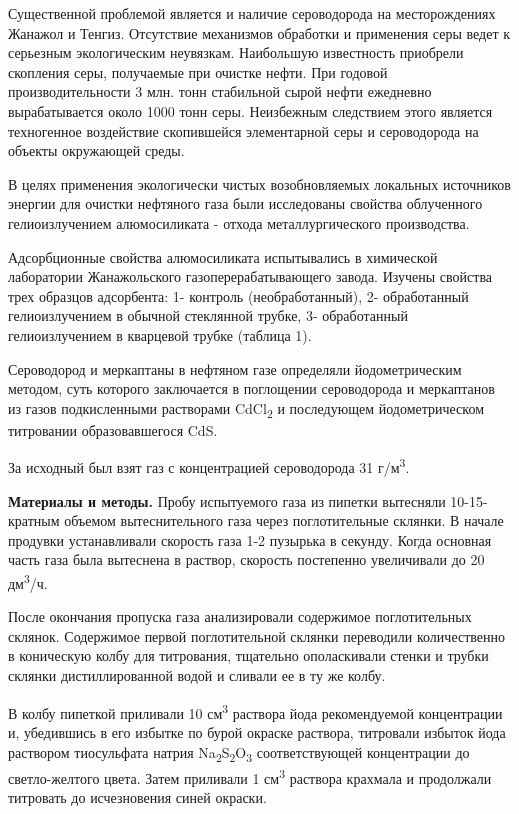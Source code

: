 \begin{multicols}{2}
Существенной проблемой является и наличие сероводорода на месторождениях
Жанажол и Тенгиз. Отсутствие механизмов обработки и применения серы
ведет к серьезным экологическим неувязкам. Наибольшую известность
приобрели скопления серы, получаемые при очистке нефти. При годовой
производительности 3 млн. тонн стабильной сырой нефти ежедневно
вырабатывается около 1000 тонн серы. Неизбежным следствием этого
является техногенное воздействие скопившейся элементарной серы и
сероводорода на объекты окружающей среды.

В целях применения экологически чистых возобновляемых локальных
источников энергии для очистки нефтяного газа были исследованы свойства
облученного гелиоизлучением алюмосиликата - отхода металлургического
производства.

Адсорбционные свойства алюмосиликата испытывались в химической
лаборатории Жанажольского газоперерабатывающего завода. Изучены свойства
трех образцов адсорбента: 1- контроль (необработанный), 2- обработанный
гелиоизлучением в обычной стеклянной трубке, 3- обработанный
гелиоизлучением в кварцевой трубке (таблица 1).

Сероводород и меркаптаны в нефтяном газе определяли йодометрическим
методом, суть которого заключается в поглощении сероводорода и
меркаптанов из газов подкисленными растворами CdCl\textsubscript{2} и
последующем йодометрическом титровании образовавшегося CdS.

За исходный был взят газ с концентрацией сероводорода 31
г/м\textsuperscript{3}.

{\bfseries Материалы и методы.} Пробу испытуемого газа из пипетки вытесняли
10-15-кратным объемом вытеснительного газа через поглотительные склянки.
В начале продувки устанавливали скорость газа 1-2 пузырька в секунду.
Когда основная часть газа была вытеснена в раствор, скорость постепенно
увеличивали до 20 дм\textsuperscript{3}/ч.

После окончания пропуска газа анализировали содержимое поглотительных
склянок. Содержимое первой поглотительной склянки переводили
количественно в коническую колбу для титрования, тщательно ополаскивали
стенки и трубки склянки дистиллированной водой и сливали ее в ту же
колбу.

В колбу пипеткой приливали 10 см\textsuperscript{3} раствора йода
рекомендуемой концентрации и, убедившись в его избытке по бурой окраске
раствора, титровали избыток йода раствором тиосульфата натрия
Na\textsubscript{2}S\textsubscript{2}O\textsubscript{3} соответствующей
концентрации до светло-желтого цвета. Затем приливали 1
см\textsuperscript{3} раствора крахмала и продолжали титровать до
исчезновения синей окраски.


\end{multicols}
